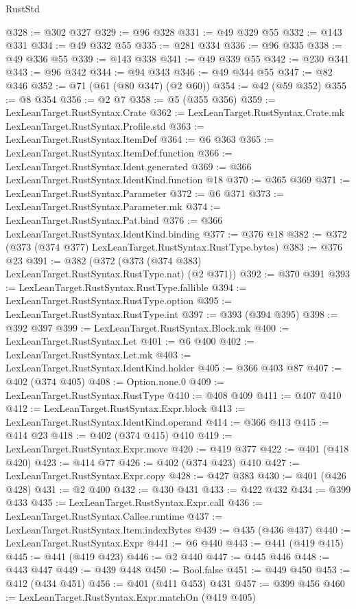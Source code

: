 \begin{lexlean}{RustStd}
\begin{coremodule}
@328 := @302 @327
@329 := @96 @328
@331 := @49 @329 @55
@332 := @143 @331
@334 := @49 @332 @55
@335 := @281 @334
@336 := @96 @335
@338 := @49 @336 @55
@339 := @143 @338
@341 := @49 @339 @55
@342 := @230 @341
@343 := @96 @342
@344 := @94 @343
@346 := @49 @344 @55
@347 := @82 @346
@352 := @71 (@61 (@80 @347) (@2 @60))
@354 := @42 (@59 @352)
@355 := @8 @354
@356 := @2 @7
@358 := @5 (@355 @356)
@359 := LexLeanTarget.RustSyntax.Crate
@362 := LexLeanTarget.RustSyntax.Crate.mk LexLeanTarget.RustSyntax.Profile.std
@363 := LexLeanTarget.RustSyntax.ItemDef
@364 := @6 @363
@365 := LexLeanTarget.RustSyntax.ItemDef.function
@366 := LexLeanTarget.RustSyntax.Ident.generated
@369 := @366 LexLeanTarget.RustSyntax.IdentKind.function @18
@370 := @365 @369
@371 := LexLeanTarget.RustSyntax.Parameter
@372 := @6 @371
@373 := LexLeanTarget.RustSyntax.Parameter.mk
@374 := LexLeanTarget.RustSyntax.Pat.bind
@376 := @366 LexLeanTarget.RustSyntax.IdentKind.binding
@377 := @376 @18
@382 := @372 (@373 (@374 @377) LexLeanTarget.RustSyntax.RustType.bytes)
@383 := @376 @23
@391 := @382 (@372 (@373 (@374 @383) LexLeanTarget.RustSyntax.RustType.nat) (@2 @371))
@392 := @370 @391
@393 := LexLeanTarget.RustSyntax.RustType.fallible
@394 := LexLeanTarget.RustSyntax.RustType.option
@395 := LexLeanTarget.RustSyntax.RustType.int
@397 := @393 (@394 @395)
@398 := @392 @397
@399 := LexLeanTarget.RustSyntax.Block.mk
@400 := LexLeanTarget.RustSyntax.Let
@401 := @6 @400
@402 := LexLeanTarget.RustSyntax.Let.mk
@403 := LexLeanTarget.RustSyntax.IdentKind.holder
@405 := @366 @403 @87
@407 := @402 (@374 @405)
@408 := Option.none.{0}
@409 := LexLeanTarget.RustSyntax.RustType
@410 := @408 @409
@411 := @407 @410
@412 := LexLeanTarget.RustSyntax.Expr.block
@413 := LexLeanTarget.RustSyntax.IdentKind.operand
@414 := @366 @413
@415 := @414 @23
@418 := @402 (@374 @415) @410
@419 := LexLeanTarget.RustSyntax.Expr.move
@420 := @419 @377
@422 := @401 (@418 @420)
@423 := @414 @77
@426 := @402 (@374 @423) @410
@427 := LexLeanTarget.RustSyntax.Expr.copy
@428 := @427 @383
@430 := @401 (@426 @428)
@431 := @2 @400
@432 := @430 @431
@433 := @422 @432
@434 := @399 @433
@435 := LexLeanTarget.RustSyntax.Expr.call
@436 := LexLeanTarget.RustSyntax.Callee.runtime
@437 := LexLeanTarget.RustSyntax.Item.indexBytes
@439 := @435 (@436 @437)
@440 := LexLeanTarget.RustSyntax.Expr
@441 := @6 @440
@443 := @441 (@419 @415)
@445 := @441 (@419 @423)
@446 := @2 @440
@447 := @445 @446
@448 := @443 @447
@449 := @439 @448
@450 := Bool.false
@451 := @449 @450
@453 := @412 (@434 @451)
@456 := @401 (@411 @453) @431
@457 := @399 @456
@460 := LexLeanTarget.RustSyntax.Expr.matchOn (@419 @405)

\end{coremodule}
\end{lexlean}
